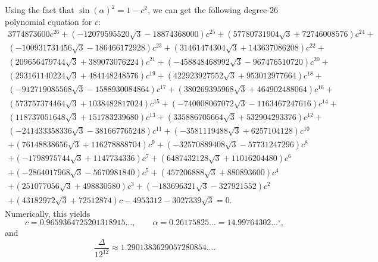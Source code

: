 \documentclass{article}
\theoremstyle{definition}
\begin{document}
Using the fact that \(\sin(\alpha)^2=1-c^2\), we can get the following degree-$26$ polynomial equation for \(c\):
\begin{multline}
    3774873600 c^{26}+\left(-12079595520 \sqrt{3}-18874368000\right) c^{25}+\left(57780731904 \sqrt{3}+72746008576\right) c^{24}+\\\left(-100931731456 \sqrt{3}-186466172928\right) c^{23}+\left(31461474304 \sqrt{3}+143637086208\right) c^{22}+\\\left(209656479744 \sqrt{3}+389073076224\right) c^{21}+\left(-458848468992 \sqrt{3}-967476510720\right) c^{20}+\\\left(293161140224 \sqrt{3}+484148248576\right) c^{19}+\left(422923927552 \sqrt{3}+953012977664\right) c^{18}+\\\left(-912719085568 \sqrt{3}-1588930084864\right) c^{17}+\left(380269395968 \sqrt{3}+464902488064\right) c^{16}+\\\left(573757374464 \sqrt{3}+1038482817024\right) c^{15}+\left(-740008067072 \sqrt{3}-1163467247616\right) c^{14}+\\\left(118737051648 \sqrt{3}+151783239680\right) c^{13}+\left(335886705664 \sqrt{3}+532904293376\right) c^{12}+\\\left(-241433358336 \sqrt{3}-381667765248\right) c^{11}+\left(-3581119488 \sqrt{3}+6257104128\right) c^{10}\\
    +\left(76148838656 \sqrt{3}+116278888704\right) c^{9}+\left(-32570889408 \sqrt{3}-57731247296\right) c^{8}\\
    +\left(-1798975744 \sqrt{3}+1147734336\right) c^{7}+\left(6487432128 \sqrt{3}+11016204480\right) c^{6}\\+\left(-2864017968 \sqrt{3}-5670981840\right) c^{5}+\left(457206888 \sqrt{3}+880893600\right) c^{4}\\+\left(251077056 \sqrt{3}+498830580\right) c^{3}+\left(-183696321 \sqrt{3}-327921552\right) c^{2}\\+\left(43182972 \sqrt{3}+72512874\right) c-4953312-3027339 \sqrt{3}=0.
\end{multline}
Numerically, this yields
\[
c=0.9659364725201318915\ldots,\qquad
\alpha=0.26175825\ldots=14.99764302\ldots^\circ,
\]
and
\[
\frac{\Delta}{12^{12}}\approx 1.2901383629057280854\ldots.
\]
\end{document}
